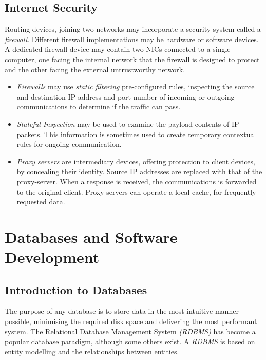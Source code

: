 \documentclass[10pt]{article}
\let\oldsection\section
\renewcommand\section{\clearpage\oldsection}
\begin{document}
\subsection{Internet Security}
\label{sec:org3a6c218}

Routing devices, joining two networks may incorporate a security system called a \emph{firewall}. Different firewall implementations may be hardware or software devices. A dedicated firewall device may contain two NICs connected to a single computer, one facing the internal network that the firewall is designed to protect and the other facing the external untrustworthy network.

\begin{itemize}
\item \emph{Firewalls} may use \emph{static filtering} pre-configured rules, inspecting the source and destination IP address and port number of incoming or outgoing communications to determine if the traffic can pass.

\item \emph{Stateful Inspection} may be used to examine the payload contents of IP packets. This information is sometimes used to create temporary contextual rules for ongoing communication.

\item \emph{Proxy servers} are intermediary devices, offering protection to client devices, by concealing their identity. Source IP addresses are replaced with that of the proxy-server. When a response is received, the communications is forwarded to the original client. Proxy servers can operate a local cache, for frequently requested data.
\end{itemize}

\section{Databases and Software Development}
\label{sec:orge3b1c72}
\subsection{Introduction to Databases}
\label{sec:org857cbd1}

The purpose of any database is to store data in the most intuitive manner possible, minimising the required disk space and delivering the most performant system. The Relational Database Management System \emph{(RDBMS)} has become a popular database paradigm, although some others exist. A \emph{RDBMS} is based on entity modelling and the relationships between entities.
\end{document}
